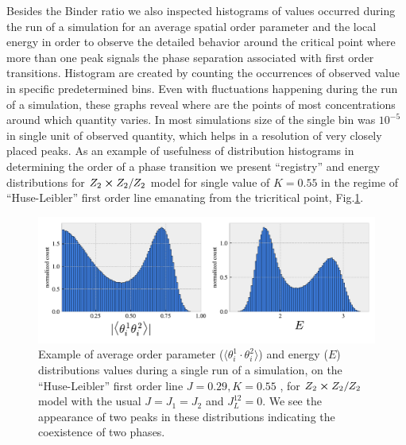Besides the Binder ratio we also inspected histograms of values occurred during the run of a simulation for an average spatial order parameter and the local energy in order to observe the detailed behavior around the critical point where more than one peak signals the phase separation associated with first order transitions. Histogram are created by counting the occurrences of observed value in specific predetermined bins. Even with fluctuations happening during the run of a simulation, these graphs reveal where are the points of most concentrations around which quantity varies. In most simulations size of the single bin was $10^{-5}$ in single unit of observed quantity, which helps in a resolution of very closely placed peaks. As an example of usefulness of distribution histograms in determining the order of a phase transition we present ``registry'' and energy distributions for $Z_2 \cross Z_2 / Z_2$ model for single value of $K=0.55$ in the regime of ``Huse-Leibler'' first order line emanating from the tricritical point, Fig.\ref{distributions}.

\begin{figure}[!h]
	\centering
	\includegraphics[scale=.7]{figures/chapter2/Z2xZ2Z2K57.pdf}
	\caption{Example of average order parameter ($\langle \theta^1_i \cdot \theta^2_i \rangle$) and energy ($E$) distributions values during a single run of a simulation, on the ``Huse-Leibler'' first order line $J=0.29, K=0.55$ , for $Z_2 \cross Z_2 / Z_2$ model with the usual $J=J_1=J_2$ and $J_L^{12}=0$. We see the appearance of two peaks in these distributions indicating the coexistence of two phases.}
	\label{distributions}	
\end{figure}



